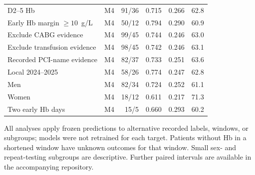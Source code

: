 \documentclass[pdflatex,sn-vancouver-num]{sn-jnl}
\begin{document}
\begin{longtable}{p{4.4cm}lrrrr}
D2--5 Hb & M4 & 91/36 & 0.715 & 0.266 & 62.8\\
Early Hb margin $\geq 10$~g/L & M4 & 50/12 & 0.794 & 0.290 & 60.9\\
Exclude CABG evidence & M4 & 99/45 & 0.744 & 0.246 & 63.0\\
Exclude transfusion evidence & M4 & 98/45 & 0.742 & 0.246 & 63.1\\
Recorded PCI-name evidence & M4 & 82/37 & 0.733 & 0.251 & 63.6\\
Local 2024--2025 & M4 & 58/26 & 0.774 & 0.247 & 62.8\\
Men & M4 & 82/34 & 0.724 & 0.252 & 61.1\\
Women & M4 & 18/12 & 0.611 & 0.217 & 71.3\\
Two early Hb days & M4 & 15/5 & 0.660 & 0.293 & 60.2\\
\end{longtable}
\noindent All analyses apply frozen predictions to alternative recorded labels, windows, or subgroups; models were not retrained for each target. Patients without Hb in a shortened window have unknown outcomes for that window. Small sex- and repeat-testing subgroups are descriptive. Further paired intervals are available in the accompanying repository.\par\endgroup
\begingroup\scriptsize\setlength{\tabcolsep}{2pt}
\end{document}
